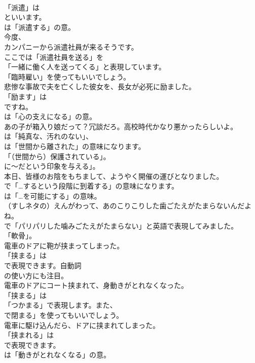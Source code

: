 \documentclass[8pt]{extreport}
\begin{document}
\begin{CJK}{UTF8}{min}
\\	「派遣」は 
\\	といいます。
\\	は「派遣する」の意。	
\\	今度、
\\	カンパニーから派遣社員が来るそうです。 
\\	ここでは「派遣社員を送る」を
\\	「一緒に働く人を送ってくる」と表現しています。
\\	「臨時雇い」を使ってもいいでしょう。	
\\	悲惨な事故で夫を亡くした彼女を、長女が必死に励ました。 
\\	「励ます」は 
\\	ですね。
\\	は「心の支えになる」の意。	
\\	あの子が箱入り娘だって？冗談だろ。高校時代かなり悪かったらしいよ。 
\\	は「純真な、汚れのない」、
\\	は「世間から離された」の意味になります。
\\	「（世間から）保護されている」。
\\	に～だという印象を与える」。	
\\	本日、皆様のお陰をもちまして、ようやく開催の運びとなりました。 
\\	で「…するという段階に到着する」の意味になります。
\\	は「…を可能にする」の意味。	
\\	（すしネタの）えんがわって、あのこりこりした歯ごたえがたまらないんだよね。 
\\	で「パリパリした噛みごたえがたまらない」と英語で表現してみました。
\\	「軟骨」。	
\\	電車のドアに鞄が挟まってしまった。 
\\	「挟まる」は 
\\	で表現できます。自動詞 
\\	の使い方にも注目。	
\\	電車のドアにコート挟まれて、身動きがとれなくなった。 
\\	「挟まる」は
\\	「つかまる」で表現します。また、
\\	で閉まる」を使ってもいいでしょう。	
\\	電車に駆け込んだら、ドアに挟まれてしまった。 
\\	「挟まれる」は 
\\	で表現できます。
\\	は「動きがとれなくなる」の意。	

\end{CJK}
\end{document}
